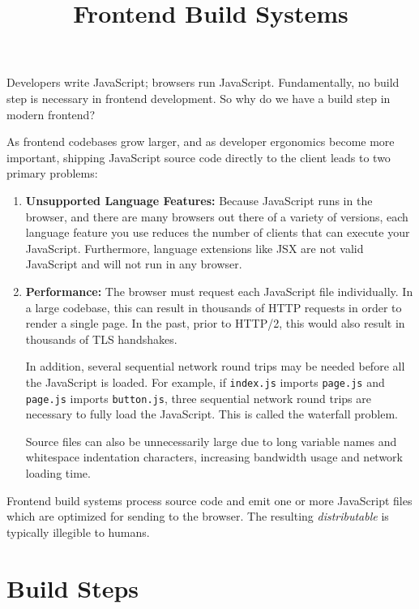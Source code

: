 \documentclass{article}
\title{Frontend Build Systems}
\begin{document}
\maketitle
\tableofcontents

Developers write JavaScript; browsers run JavaScript. Fundamentally, no build step is necessary in
frontend development. So why do we have a build step in modern frontend?

As frontend codebases grow larger, and as developer ergonomics become more important, shipping
JavaScript source code directly to the client leads to two primary problems:

\begin{enumerate}
  \item \textbf{Unsupported Language Features:} Because JavaScript runs in the browser, and there
    are many browsers out there of a variety of versions, each language feature you use reduces the
    number of clients that can execute your JavaScript. Furthermore, language extensions like JSX
    are not valid JavaScript and will not run in any browser.

  \item \textbf{Performance:} The browser must request each JavaScript file individually. In a large
    codebase, this can result in thousands of HTTP requests in order to render a single page. In the
    past, prior to HTTP/2, this would also result in thousands of TLS handshakes.

    In addition, several sequential network round trips may be needed before all the JavaScript is
    loaded. For example, if \texttt{index.js} imports \texttt{page.js} and \texttt{page.js} imports
    \texttt{button.js}, three sequential network round trips are necessary to fully load the
    JavaScript. This is called the waterfall problem.

    Source files can also be unnecessarily large due to long variable names and whitespace
    indentation characters, increasing bandwidth usage and network loading time.
\end{enumerate}

Frontend build systems process source code and emit one or more JavaScript files which are optimized
for sending to the browser. The resulting \textit{distributable} is typically illegible to humans.

\section{Build Steps}
\end{document}
